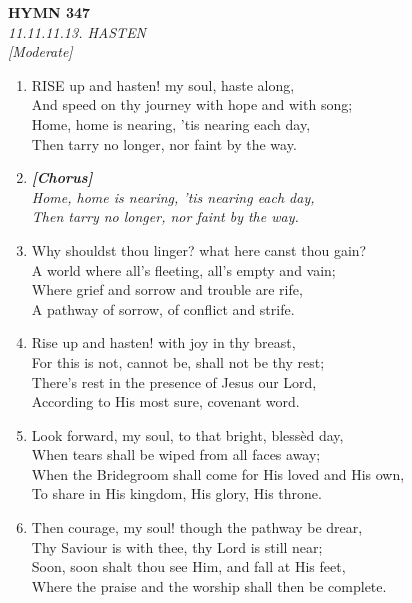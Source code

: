 \documentclass[11pt,a4paper]{article}
\begin{document}
\newpage
\begin{center}
    {\Large \textbf{HYMN 347}}
    \\
    \textit{11.11.11.13. HASTEN}
    \\
    \textit{\small [Moderate]}
\end{center}
\vspace{1em}

\begin{enumerate}
    \item RISE up and hasten! my soul, haste along, \\
        And speed on thy journey with hope and with song; \\
        Home, home is nearing, 'tis nearing each day, \\
        Then tarry no longer, nor faint by the way.

    \item[] \vspace{0.4em}
    \textbf{\textit{[Chorus]}} \\
    \textit{Home, home is nearing, 'tis nearing each day,} \\
    \textit{Then tarry no longer, nor faint by the way.}
    \vspace{0.4em}

    \item Why shouldst thou linger? what here canst thou gain? \\
        A world where all's fleeting, all's empty and vain; \\
        Where grief and sorrow and trouble are rife, \\
        A pathway of sorrow, of conflict and strife.

    \item Rise up and hasten! with joy in thy breast, \\
        For this is not, cannot be, shall not be thy rest; \\
        There's rest in the presence of Jesus our Lord, \\
        According to His most sure, covenant word.

    \item Look forward, my soul, to that bright, bless\`ed day, \\
        When tears shall be wiped from all faces away; \\
        When the Bridegroom shall come for His loved and His own, \\
        To share in His kingdom, His glory, His throne.

    \item Then courage, my soul! though the pathway be drear, \\
        Thy Saviour is with thee, thy Lord is still near; \\
        Soon, soon shalt thou see Him, and fall at His feet, \\
        Where the praise and the worship shall then be complete.

\end{enumerate}
\end{document}
